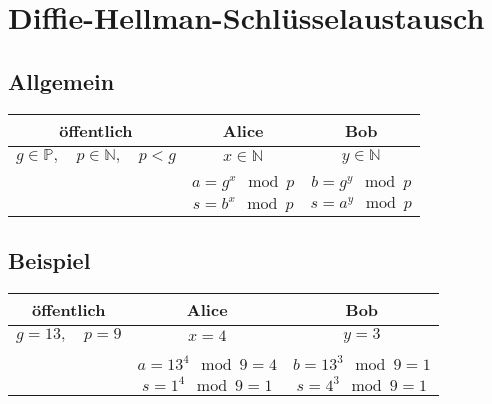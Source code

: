\documentclass[a4paper]{report}
\begin{document}
\chapter*{Diffie-Hellman-Schlüsselaustausch}
\section*{Allgemein}
\begin{center}
\begin{tabular}{c|c|c}
    öffentlich & Alice & Bob \\
    \hline
    $g\in\mathbb{P},\quad p\in\mathbb{N},\quad p<g$ &
    $x\in\mathbb{N}$ &
    $y\in\mathbb{N}$ \\ & & \\
    &
    $a=g^x \mod p$ &
    $b=g^y \mod p$ \\
    & $s=b^x \mod p$ & $s=a^y \mod p$
\end{tabular}
\end{center}

\section*{Beispiel}
\begin{center}
\begin{tabular}{c|c|c}
    öffentlich & Alice & Bob \\
    \hline
    $g=13,\quad p=9$ &
    $x=4$ &
    $y=3$ \\ & & \\
    &
    $a=13^4 \mod 9=4$ &
    $b=13^3 \mod 9=1$ \\
    & $s=1^4 \mod 9=1$ & $s=4^3 \mod 9=1$
\end{tabular}
\end{center}
\end{document}
